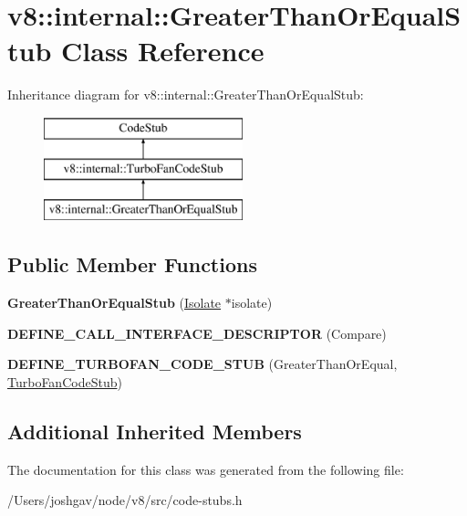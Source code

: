 \hypertarget{classv8_1_1internal_1_1_greater_than_or_equal_stub}{}\section{v8\+:\+:internal\+:\+:Greater\+Than\+Or\+Equal\+Stub Class Reference}
\label{classv8_1_1internal_1_1_greater_than_or_equal_stub}
Inheritance diagram for v8\+:\+:internal\+:\+:Greater\+Than\+Or\+Equal\+Stub\+:\begin{figure}[H]
\begin{center}
\leavevmode
\includegraphics[height=3.000000cm]{classv8_1_1internal_1_1_greater_than_or_equal_stub}
\end{center}
\end{figure}
\subsection*{Public Member Functions}
\begin{DoxyCompactItemize}
\item 
{\bfseries Greater\+Than\+Or\+Equal\+Stub} (\hyperlink{classv8_1_1internal_1_1_isolate}{Isolate} $\ast$isolate)\hypertarget{classv8_1_1internal_1_1_greater_than_or_equal_stub_a3e16426a5ad2664825d534ca900e3738}{}\label{classv8_1_1internal_1_1_greater_than_or_equal_stub_a3e16426a5ad2664825d534ca900e3738}

\item 
{\bfseries D\+E\+F\+I\+N\+E\+\_\+\+C\+A\+L\+L\+\_\+\+I\+N\+T\+E\+R\+F\+A\+C\+E\+\_\+\+D\+E\+S\+C\+R\+I\+P\+T\+OR} (Compare)\hypertarget{classv8_1_1internal_1_1_greater_than_or_equal_stub_a42c47fed888220f3c13a4da06ecf879c}{}\label{classv8_1_1internal_1_1_greater_than_or_equal_stub_a42c47fed888220f3c13a4da06ecf879c}

\item 
{\bfseries D\+E\+F\+I\+N\+E\+\_\+\+T\+U\+R\+B\+O\+F\+A\+N\+\_\+\+C\+O\+D\+E\+\_\+\+S\+T\+UB} (Greater\+Than\+Or\+Equal, \hyperlink{classv8_1_1internal_1_1_turbo_fan_code_stub}{Turbo\+Fan\+Code\+Stub})\hypertarget{classv8_1_1internal_1_1_greater_than_or_equal_stub_a3fa16ab85b839d17f34eb7f01583ddb6}{}\label{classv8_1_1internal_1_1_greater_than_or_equal_stub_a3fa16ab85b839d17f34eb7f01583ddb6}

\end{DoxyCompactItemize}
\subsection*{Additional Inherited Members}


The documentation for this class was generated from the following file\+:\begin{DoxyCompactItemize}
\item 
/\+Users/joshgav/node/v8/src/code-\/stubs.\+h\end{DoxyCompactItemize}
